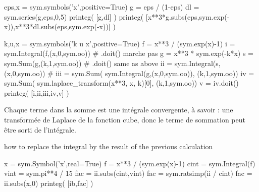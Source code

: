 \documentclass[12pt,hyperref]{article}
\begin{document}

\begin{pyblock}[dlsigmaint][fontsize=\scriptsize]
eps,x = sym.symbols('\epsilon x',positive=True)
g = eps / (1-eps)
dl = sym.series(g,eps,0,5)
printeg( [g,dl] )
printeg( [x**3*g.subs(eps,sym.exp(-x)),x**3*dl.subs(eps,sym.exp(-x))] )
\end{pyblock}
\printpythontex

\begin{pyblock}[sigmaint][fontsize=\scriptsize]
k,u,x = sym.symbols('k u x',positive=True)
f = x**3 / (sym.exp(x)-1)
i = sym.Integral(f,(x,0,sym.oo)) # .doit() marche pas
g = x**3 * sym.exp(-k*x)
s = sym.Sum(g,(k,1,sym.oo)) # .doit() same as above
ii = sym.Integral(s,(x,0,sym.oo)) #
iii = sym.Sum( sym.Integral(g,(x,0,sym.oo)), (k,1,sym.oo))
iv = sym.Sum( sym.laplace_transform(x**3, x, k)[0], (k,1,sym.oo))
v = iv.doit()
printeg( [i,ii,iii,iv,v] )
\end{pyblock}
\printpythontex

\noindent Chaque terme dans la somme est une intégrale convergente, à savoir : une transformée
de Laplace de la fonction cube, donc le terme de sommation peut être sorti de l'intégrale.

how to replace the integral by the result of the previous calculation

\begin{pyblock}[planck][fontsize=\scriptsize]
x = sym.Symbol('x',real=True)
f = x**3 / (sym.exp(x)-1)
cint = sym.Integral(f)
vint = sym.pi**4 / 15
fac = ii.subs(cint,vint)
fac = sym.ratsimp(ii / cint)
fac = ii.subs(x,0)
printeg( [ib,fac] )
\end{pyblock}
\printpythontex
\end{document}
